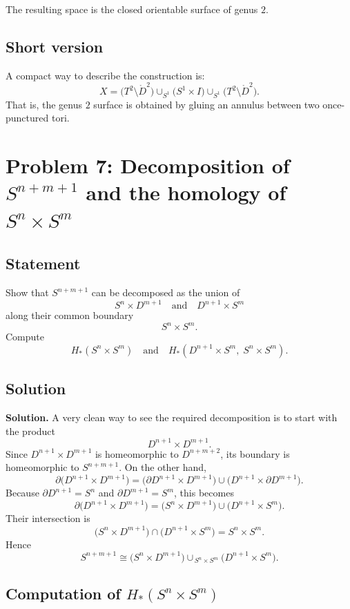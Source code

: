\documentclass[12pt,a4paper]{article}
\theoremstyle{notespace}
\begin{document}
The resulting space is the closed orientable surface of genus \(2\).

\subsection{Short version}

A compact way to describe the construction is:
\[
X
=
\bigl(T^2\setminus \mathring{D}^2\bigr)
\cup_{S^1}
\bigl(S^1\times I\bigr)
\cup_{S^1}
\bigl(T^2\setminus \mathring{D}^2\bigr).
\]
That is, the genus \(2\) surface is obtained by gluing an annulus between two once-punctured tori.

\section{Problem 7: Decomposition of \(S^{n+m+1}\) and the homology of \(S^n \times S^m\)}

\subsection{Statement}

Show that \(S^{n+m+1}\) can be decomposed as the union of
\[
S^n \times D^{m+1}
\quad\text{and}\quad
D^{n+1} \times S^m
\]
along their common boundary
\[
S^n \times S^m.
\]
Compute
\[
H_*(S^n \times S^m)
\quad\text{and}\quad
H_*(D^{n+1} \times S^m,\; S^n \times S^m).
\]

\subsection{Solution}

\textbf{Solution.}
A very clean way to see the required decomposition is to start with the product
\[
D^{n+1} \times D^{m+1}.
\]
Since \(D^{n+1} \times D^{m+1}\) is homeomorphic to \(D^{n+m+2}\), its boundary is homeomorphic to \(S^{n+m+1}\). On the other hand,
\[
\partial\bigl(D^{n+1} \times D^{m+1}\bigr)
=
\bigl(\partial D^{n+1} \times D^{m+1}\bigr)
\cup
\bigl(D^{n+1} \times \partial D^{m+1}\bigr).
\]
Because \(\partial D^{n+1} = S^n\) and \(\partial D^{m+1} = S^m\), this becomes
\[
\partial\bigl(D^{n+1} \times D^{m+1}\bigr)
=
\bigl(S^n \times D^{m+1}\bigr)
\cup
\bigl(D^{n+1} \times S^m\bigr).
\]
Their intersection is
\[
\bigl(S^n \times D^{m+1}\bigr)\cap\bigl(D^{n+1} \times S^m\bigr)
=
S^n \times S^m.
\]
Hence
\[
S^{n+m+1}
\cong
\bigl(S^n \times D^{m+1}\bigr)\cup_{\,S^n \times S^m}\bigl(D^{n+1} \times S^m\bigr).
\]

\subsection{Computation of \(H_*(S^n \times S^m)\)}
\end{document}
